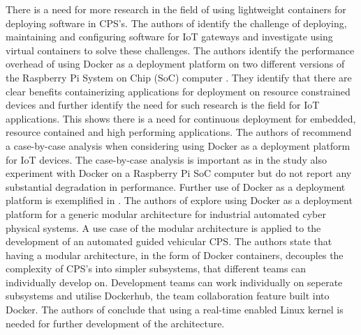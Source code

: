 There is a need for more research in the field of using lightweight containers for deploying software in CPS's. The authors of \cite{2iot} identify the challenge of deploying, maintaining and configuring software for IoT gateways and investigate using virtual containers to solve these challenges. The authors identify the performance overhead of using Docker as a deployment platform on two different versions of the Raspberry Pi System on Chip (SoC) computer \cite{raspberry}. They identify that there are clear benefits containerizing applications for deployment on resource constrained devices and further identify the need for such research is the field for IoT applications. This shows there is a need for continuous deployment for embedded, resource contained and high performing applications. The authors of \cite{2iot} recommend a case-by-case analysis when considering using Docker as a deployment platform for IoT devices. The case-by-case analysis is important as in \cite{gonz} the study also experiment with Docker on a Raspberry Pi SoC computer but do not report any substantial degradation in performance. Further use of Docker as a deployment platform is exemplified in \cite{gonz}. The authors of \cite{gonz} explore using Docker as a deployment platform for a generic modular architecture for industrial automated cyber physical systems. A use case of the modular architecture is applied to the development of an automated guided vehicular CPS. The authors state that having a modular architecture, in the form of Docker containers, decouples the complexity of CPS's into simpler subsystems, that different teams can individually develop on. Development teams can work individually on seperate subsystems and utilise Dockerhub, the team collaboration feature built into Docker. The authors of \cite{gonz} conclude that using a real-time enabled Linux kernel is needed for further development of the architecture. \\

